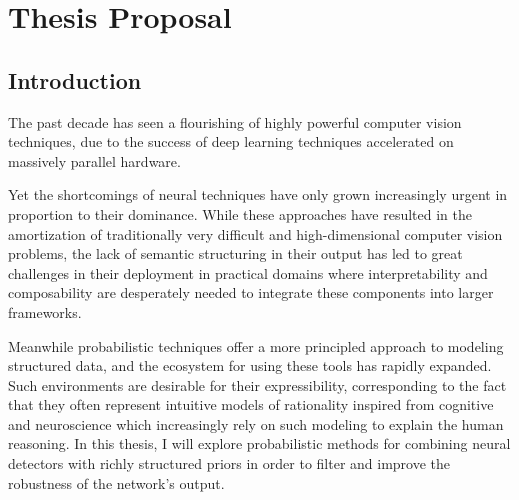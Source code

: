 
\chapter{Thesis Proposal}

\section{Introduction}

  The past decade has seen a flourishing of highly powerful computer vision
  techniques, due to the success of deep learning techniques accelerated on
  massively parallel hardware.

  Yet the shortcomings of neural techniques have only grown increasingly urgent
  in proportion to their dominance. While these approaches have resulted in the
  amortization of traditionally very difficult and high-dimensional computer
  vision problems, the lack of semantic structuring in their output has led to
  great challenges in their deployment in practical domains where
  interpretability and composability are desperately needed to integrate these
  components into larger frameworks.

  Meanwhile probabilistic techniques offer a more principled approach to
  modeling structured data, and the ecosystem for using these tools has rapidly
  expanded. Such environments are desirable for their expressibility,
  corresponding to the fact that they often represent intuitive models of
  rationality inspired from cognitive and neuroscience which increasingly rely
  on such modeling to explain the human reasoning. In this thesis, I will
  explore probabilistic methods for combining neural detectors with richly
  structured priors in order to filter and improve the robustness of the
  network's output.
